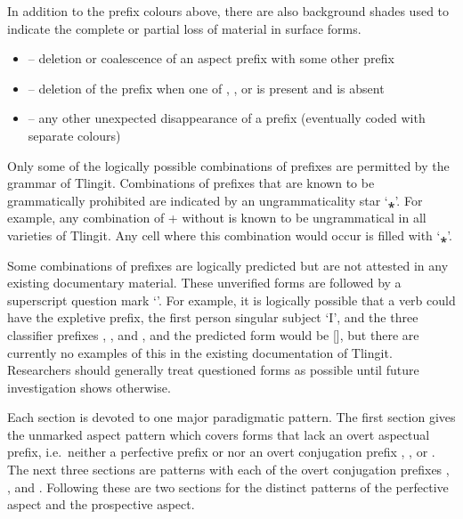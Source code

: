 \documentclass[12pt,letterpaper,landscape,oneside,article]{memoir}
\begin{document}
\begin{multicols}{2}
In addition to the prefix colours above, there are also background shades used to indicate the complete or partial loss of material in surface forms.

\begin{itemize}[leftmargin=0.75em]
\item	{}
	– deletion or coalescence of an aspect prefix with some other prefix
\item	{}
	– deletion of the  prefix when one of , , or  is present and  is absent
\item	{}
	– any other unexpected disappearance of a prefix (eventually coded with separate colours)
\end{itemize}

Only some of the logically possible combinations of prefixes are permitted by the grammar of Tlingit.
Combinations of prefixes that are known to be grammatically prohibited are indicated by an ungrammaticality star ‘⁎’.
For example, any combination of  +  without  is known to be ungrammatical in all varieties of Tlingit.
Any cell where this combination would occur is filled with ‘⁎’.

Some combinations of prefixes are logically predicted but are not attested in any existing documentary material.
These unverified forms are followed by a superscript question mark ‘\hspace{0.125ex}\supques{}\hspace{0.125ex}’.
For example, it is logically possible that a verb could have the expletive  prefix, the first person singular subject  ‘I’, and the three classifier prefixes , , and , and the predicted form would be \supques{} []\supques{}, but there are currently no examples of this in the existing documentation of Tlingit.
Researchers should generally treat questioned forms as possible until future investigation shows otherwise.

Each section is devoted to one major paradigmatic pattern.
The first section gives the unmarked aspect pattern which covers forms that lack an overt aspectual prefix, i.e.\ neither a perfective prefix  or  nor an overt conjugation prefix , , or .
The next three sections are patterns with each of the overt conjugation prefixes , , and .
Following these are two sections for the distinct patterns of the perfective aspect and the prospective aspect.


\end{multicols}
\end{document}
